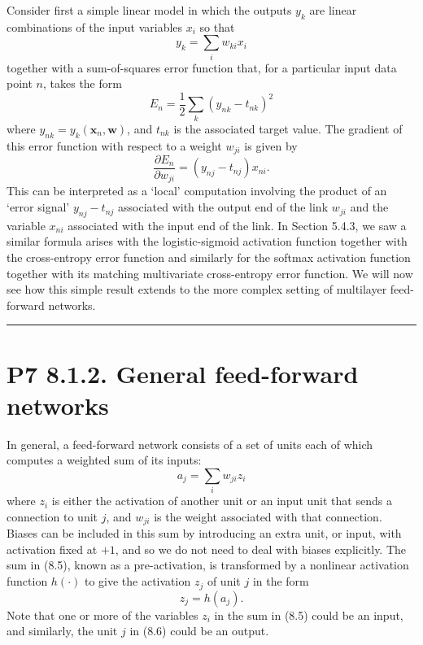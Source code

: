 \documentclass{article}
\begin{document}
Consider first a simple linear model in which the outputs $y_k$ are linear combinations of the input variables $x_i$ so that
\begin{equation}
    y_k = \sum_i w_{ki} x_i
    \tag{8.2}
\end{equation}
together with a sum-of-squares error function that, for a particular input data point $n$, takes the form
\begin{equation}
    E_n = \frac{1}{2} \sum_k (y_{nk} - t_{nk})^2
    \tag{8.3}
\end{equation}
where $y_{nk} = y_k(\mathbf{x}_n, \mathbf{w})$, and $t_{nk}$ is the associated target value. The gradient of this error function with respect to a weight $w_{ji}$ is given by
\begin{equation}
    \frac{\partial E_n}{\partial w_{ji}} = (y_{nj} - t_{nj}) x_{ni}.
    \tag{8.4}
\end{equation}
This can be interpreted as a `local' computation involving the product of an `error signal' $y_{nj} - t_{nj}$ associated with the output end of the link $w_{ji}$ and the variable $x_{ni}$ associated with the input end of the link. In Section 5.4.3, we saw a similar formula arises with the logistic-sigmoid activation function together with the cross-entropy error function and similarly for the softmax activation function together with its matching multivariate cross-entropy error function. We will now see how this simple result extends to the more complex setting of multilayer feed-forward networks.

\noindent\rule{\linewidth}{0.4pt}

\section{P7 8.1.2. General feed-forward networks}

In general, a feed-forward network consists of a set of units each of which computes a weighted sum of its inputs:
\begin{equation}
    a_j = \sum_i w_{ji} z_i
    \tag{8.5}
\end{equation}
where $z_i$ is either the activation of another unit or an input unit that sends a connection to unit $j$, and $w_{ji}$ is the weight associated with that connection. Biases can be included in this sum by introducing an extra unit, or input, with activation fixed at $+1$, and so we do not need to deal with biases explicitly. The sum in (8.5), known as a pre-activation, is transformed by a nonlinear activation function $h(\cdot)$ to give the activation $z_j$ of unit $j$ in the form
\begin{equation}
    z_j = h(a_j).
    \tag{8.6}
\end{equation}
Note that one or more of the variables $z_i$ in the sum in (8.5) could be an input, and similarly, the unit $j$ in (8.6) could be an output.
\end{document}
